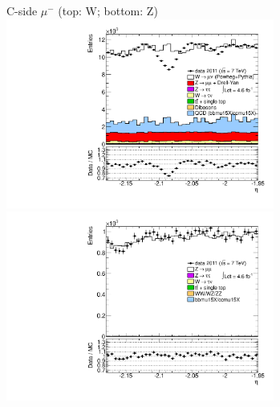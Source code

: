 {{\cole
}


 {
\colb[T]

C-side $\mu^{-}$ (top: W; bottom: Z)
\centering
\includegraphics[width=0.66\textwidth]{dates/20130306/figures/etaphi/Wnometmt_10_C_stack_l_eta_NEG} \\
\includegraphics[width=0.66\textwidth]{dates/20130306/figures/etaphi/Z_10_C_stack_lN_eta_ALL.pdf}

}}
